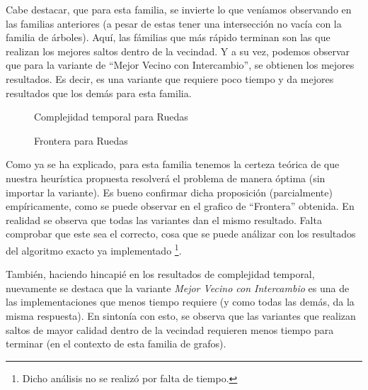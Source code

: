 \par Cabe destacar, que para esta familia, se invierte lo que ven\'iamos observando en
    las familias anteriores (a pesar de estas tener una intersecci\'on no vac\'ia con
    la familia de \'arboles). Aqu\'i, las f\'amilias que m\'as r\'apido terminan son
    las que realizan los mejores saltos dentro de la vecindad. Y a su vez, podemos
    observar que para la variante de ``Mejor Vecino con Intercambio'', se
    obtienen los mejores resultados. Es decir, es una variante que requiere poco
    tiempo y da mejores resultados que los dem\'as para esta familia.

\begin{figure}[H]
    \centering
    \fontsize{7}{10}\selectfont
    \resizebox{0.8\textwidth}{!}{}
    \caption{Complejidad temporal para Ruedas}
\end{figure}

\begin{figure}[H]
    \centering
    \fontsize{7}{10}\selectfont
    \resizebox{0.8\textwidth}{!}{}
    \caption{Frontera para Ruedas}
\end{figure}

\bigskip

\par Como ya se ha explicado, para esta familia tenemos la certeza te\'orica de que
    nuestra heur\'istica propuesta resolver\'a el problema de manera \'optima (sin
    importar la variante). Es bueno confirmar dicha proposici\'on (parcialmente) emp\'iricamente,
    como se puede observar en el grafico de ``Frontera'' obtenida. En realidad se observa
    que todas las variantes dan el mismo resultado. Falta comprobar que este sea el correcto,
    cosa que se puede an\'alizar con los resultados del algoritmo exacto ya implementado%
    \footnote{Dicho an\'alisis no se realiz\'o por falta de tiempo.}.

\par Tambi\'en, haciendo hincapi\'e en los resultados de complejidad temporal,
    nuevamente se destaca que la variante \emph{Mejor Vecino con Intercambio}
    es una de las implementaciones que menos tiempo requiere (y como todas las
    dem\'as, da la misma respuesta). En sinton\'ia con esto, se observa
    que las variantes que realizan saltos de mayor calidad dentro de la vecindad
    requieren menos tiempo para terminar (en el contexto de esta familia de grafos).


